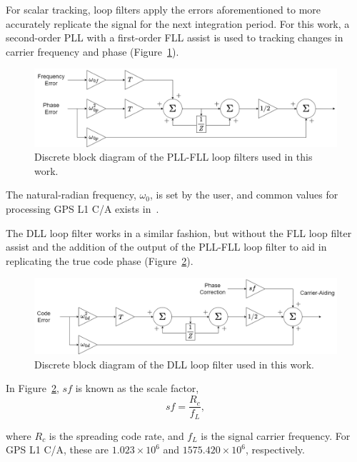 For scalar tracking, loop filters apply the errors aforementioned to more accurately replicate the signal for the next integration period. For this work, a second-order PLL with a first-order FLL assist is used to tracking changes in carrier frequency and phase (Figure~\ref{fig:PLL}).

\begin{figure}[!ht]\label{fig:PLL}
    \centering
    \includegraphics[width=\linewidth]{Figures/PLL.png}
    \caption{Discrete block diagram of the PLL-FLL loop filters used in this work.}
\end{figure}

The natural-radian frequency, \(\omega_0\), is set by the user, and common values for processing GPS L1 C/A exists in~\cite{kaplanUnderstandingGPSPrinciples2006}.

The DLL loop filter works in a similar fashion, but without the FLL loop filter assist and the addition of the output of the PLL-FLL loop filter to aid in replicating the true code phase (Figure~\ref{fig:DLL}).

\begin{figure}[!ht]\label{fig:DLL}
    \centering
    \includegraphics[width=\linewidth]{Figures/DLL.png}
    \caption{Discrete block diagram of the DLL loop filter used in this work.}
\end{figure}

In Figure~\ref{fig:DLL}, \(sf\) is known as the scale factor, 
\begin{equation}\label{eq:sf}
sf = \frac{R_c}{f_L},
\end{equation}

where \(R_c\) is the spreading code rate, and \(f_L\) is the signal carrier frequency. For GPS L1 C/A, these are \(1.023 \times 10^6\) and \(1575.420 \times 10^6\), respectively.

